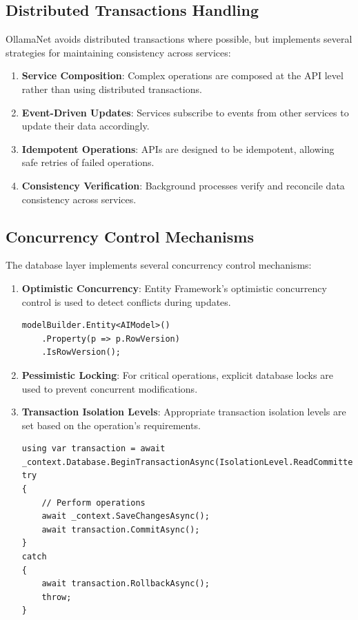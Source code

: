 \subsection{Distributed Transactions Handling}

OllamaNet avoids distributed transactions where possible, but implements several strategies for maintaining consistency across services:

\begin{enumerate}
   \item \textbf{Service Composition}: Complex operations are composed at the API level rather than using distributed transactions.

   \item \textbf{Event-Driven Updates}: Services subscribe to events from other services to update their data accordingly.

   \item \textbf{Idempotent Operations}: APIs are designed to be idempotent, allowing safe retries of failed operations.

   \item \textbf{Consistency Verification}: Background processes verify and reconcile data consistency across services.
\end{enumerate}

\subsection{Concurrency Control Mechanisms}

The database layer implements several concurrency control mechanisms:

\begin{enumerate}
   \item \textbf{Optimistic Concurrency}: Entity Framework's optimistic concurrency control is used to detect conflicts during updates.

\begin{verbatim}
modelBuilder.Entity<AIModel>()
    .Property(p => p.RowVersion)
    .IsRowVersion();
\end{verbatim}

   \item \textbf{Pessimistic Locking}: For critical operations, explicit database locks are used to prevent concurrent modifications.

   \item \textbf{Transaction Isolation Levels}: Appropriate transaction isolation levels are set based on the operation's requirements.

\begin{verbatim}
using var transaction = await _context.Database.BeginTransactionAsync(IsolationLevel.ReadCommitted);
try
{
    // Perform operations
    await _context.SaveChangesAsync();
    await transaction.CommitAsync();
}
catch
{
    await transaction.RollbackAsync();
    throw;
}
\end{verbatim}
\end{enumerate}

